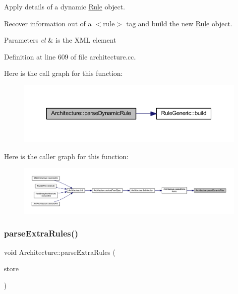 Apply details of a dynamic \mbox{\hyperlink{class_rule}{Rule}} object. 

Recover information out of a $<$rule$>$ tag and build the new \mbox{\hyperlink{class_rule}{Rule}} object. 
\begin{DoxyParams}{Parameters}
{\em el} & is the X\+ML element \\
\hline
\end{DoxyParams}


Definition at line 609 of file architecture.\+cc.

Here is the call graph for this function\+:
\nopagebreak
\begin{figure}[H]
\begin{center}
\leavevmode
\includegraphics[width=350pt]{class_architecture_aef6b370b90db6fbf3a8b8b62740c77ba_cgraph}
\end{center}
\end{figure}
Here is the caller graph for this function\+:
\nopagebreak
\begin{figure}[H]
\begin{center}
\leavevmode
\includegraphics[width=350pt]{class_architecture_aef6b370b90db6fbf3a8b8b62740c77ba_icgraph}
\end{center}
\end{figure}
\mbox{\label{class_architecture_a568ff11996bb679327d3d83dbb50d454}} 
\subsubsection{\texorpdfstring{parseExtraRules()}{parseExtraRules()}}
{\footnotesize\ttfamily void Architecture\+::parse\+Extra\+Rules (\begin{DoxyParamCaption}\item[{\mbox{\hyperlink{class_document_storage}{Document\+Storage}} \&}]{store }\end{DoxyParamCaption})\hspace{0.3cm}{\ttfamily [protected]}}



